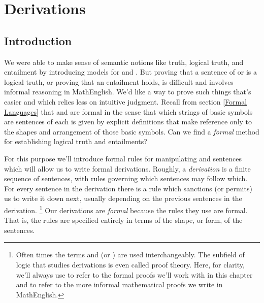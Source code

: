 
\chapter{Derivations}\label{Derivations}

\section{Introduction}\label{Derivation Preliminaries}


We were able to make sense of semantic notions like truth, logical truth, and entailment by introducing models for \GSL{} and \GQL{}.
But proving that a sentence of \GSL{} or \GQL{} is a logical truth, or proving that an entailment holds, is difficult and involves informal reasoning in MathEnglish. 
We'd like a way to prove such things that's easier and which relies less on intuitive judgment. 
Recall from section \ref{Formal Languages} that \GSL{} and \GQL{} are formal in the sense that which strings of basic symbols are sentences of each is given by explicit definitions that make reference only to the shapes and arrangement of those basic symbols. 
Can we find a \emph{formal} method for establishing logical truth and entailments?

For this purpose we'll introduce formal rules for manipulating \GSL{} and \GQL{} sentences which will allow us to write formal derivations. 
Roughly, a \emph{derivation} is a finite sequence of sentences, with rules governing which sentences may follow which. 
For every sentence in the derivation there is a rule which sanctions (or permits) us to write it down next, usually depending on the previous sentences in the derivation.%
\footnote{%
Often times the terms  and  (or ) are used interchangeably. 
The subfield of logic that studies derivations is even called proof theory.
Here, for clarity, we'll always use  to refer to the formal proofs we'll work with in this chapter and  to refer to the more informal mathematical proofs we write in MathEnglish.
} 
Our derivations are \emph{formal} because the rules they use are formal.
That is, the rules are specified entirely in terms of the shape, or form, of the sentences.

